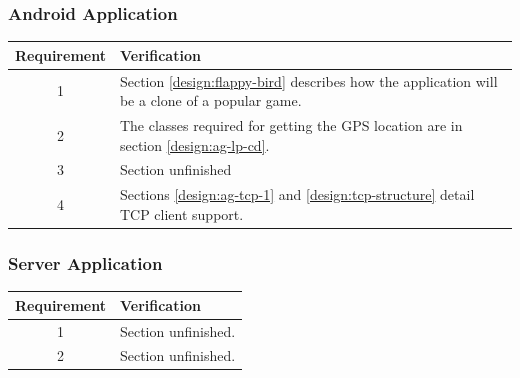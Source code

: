 \subsubsection{Android Application}
\begin{table}[!h]
	\begin{center}
		\begin{tabular}{ | c |  p{12cm} | }
			\hline
			\textbf{Requirement} & \textbf{Verification} \\ \hline
			1 & Section \ref{design:flappy-bird} describes how the application will be a clone of a popular game.\\ \hline
			2 & The classes required for getting the GPS location are in section \ref{design:ag-lp-cd}.\\ \hline
			3 & Section unfinished\\ \hline
			4 & Sections \ref{design:ag-tcp-1} and \ref{design:tcp-structure} detail TCP client support. \\ 
			\hline
		\end{tabular}
	\end{center}
\end{table}

\subsubsection{Server Application}
\begin{table}[!h]
	\begin{center}
		\begin{tabular}{ | c |  p{12cm} | }
			\hline
			\textbf{Requirement} & \textbf{Verification} \\ \hline
			1 & Section unfinished.\\ \hline
			2 & Section unfinished.\\ 
			\hline
		\end{tabular}
	\end{center}
\end{table}
\clearpage